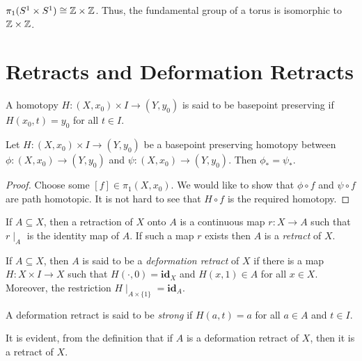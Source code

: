 \begin{corollary}
    $\pi_1(S^1\times S^1)\cong\mathbb{Z}\times\mathbb{Z}$. Thus, the fundamental group of a torus is isomorphic to $\mathbb{Z}\times\mathbb{Z}$.
\end{corollary}


\section{Retracts and Deformation Retracts}

\begin{definition}
    A homotopy $H: (X,x_0)\times I\to(Y,y_0)$ is said to be basepoint preserving if $H(x_0,t) = y_0$ for all $t\in I$.
\end{definition}

\begin{proposition}
    Let $H: (X,x_0)\times I\to(Y,y_0)$ be a basepoint preserving homotopy between $\phi: (X,x_0)\to (Y,y_0)$ and $\psi: (X,x_0)\to (Y,y_0)$. Then $\phi_* = \psi_*$.
\end{proposition}
\begin{proof}
    Choose some $[f]\in\pi_1(X,x_0)$. We would like to show that $\phi\circ f$ and $\psi\circ f$ are path homotopic. It is not hard to see that $H\circ f$ is the required homotopy.
\end{proof}

\begin{definition}[Retract]
    If $A\subseteq X$, then a retraction of $X$ onto $A$ is a continuous map $r: X\to A$ such that $r\mid_A$ is the identity map of $A$. If such a map $r$ exists then $A$ is a \textit{retract} of $X$.
\end{definition}

\begin{definition}
    If $A\subseteq X$, then $A$ is said to be a \textit{deformation retract} of $X$ if there is a map $H: X\times I\to X$ such that $H(\cdot,0) = \mathbf{id}_X$ and $H(x,1)\in A$ for all $x\in X$. Moreover, the restriction $H\mid_{A\times\{1\}} = \mathbf{id}_A$.

    A deformation retract is said to be \textit{strong} if $H(a,t) = a$ for all $a\in A$ and $t\in I$.
\end{definition}

It is evident, from the definition that if $A$ is a deformation retract of $X$, then it is a retract of $X$.

